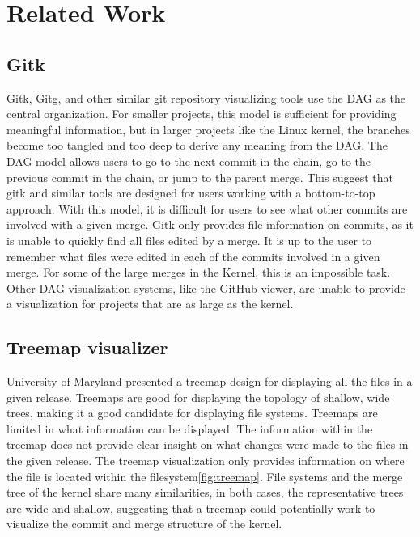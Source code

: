 \documentclass[conference, draftclsnofoot]{IEEEtran}
\begin{document}
\section{Related Work}

\subsection{Gitk}
Gitk, Gitg, and other similar git repository visualizing tools use the DAG as
the central organization. For smaller projects, this model is sufficient for
providing meaningful information, but in larger projects like the Linux kernel,
the branches become too tangled and too deep to derive any meaning from the
DAG. The DAG model allows users to go to the next commit in the chain, go to
the previous commit in the chain, or jump to the parent merge. This suggest
that gitk and similar tools are designed for users working with a bottom-to-top
approach. With this model, it is difficult for users to see what other commits
are involved with a given merge. Gitk only provides file information on
commits, as it is unable to quickly find all files edited by a merge. It is up
to the user to remember what files were edited in each of the commits involved
in a given merge. For some of the large merges in the Kernel, this is an
impossible task.  Other DAG visualization systems, like the GitHub viewer, are unable to
provide a visualization for projects that are as large as the
kernel.



\subsection{Treemap visualizer}
University of Maryland presented a treemap design for displaying all the files
in a given release. Treemaps are good for displaying the topology of shallow,
wide trees, making it a good candidate for displaying file systems. Treemaps
are limited in what information can be displayed. The information within the
treemap does not provide clear insight on what changes were made to the files
in the given release. The treemap visualization only provides information on
where the file is located within the filesystem\ref{fig:treemap}. File systems
and the merge tree of the kernel share many similarities, in both cases, the
representative trees are wide and shallow, suggesting that a treemap could
potentially work to visualize the commit and merge structure of the kernel.
\end{document}
